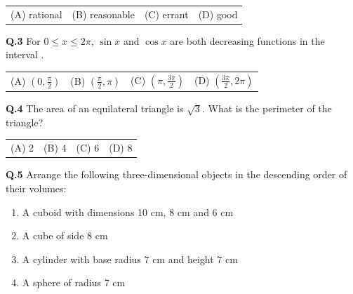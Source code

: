 \documentclass[journal,12pt,onecolumn]{IEEEtran}
\theoremstyle{remark}
\begin{document}
\begin{tabular}{llll}
\hspace{1cm} (A) rational & \hspace{0.5cm} (B) reasonable & \hspace{0.5cm} (C) errant &  \hspace{0.5cm} (D) good \\
\end{tabular}


\vspace{01cm}


\textbf{Q.3}  \hspace{0.2cm }\quad For \( 0 \leq x \leq 2\pi \), \( \sin x \) and \( \cos x \) are both decreasing functions in the interval \underline{\hspace{1cm}}.

\vspace{0.5cm}

\begin{tabular}{llll} 
\hspace{1.2cm}(A) \( \left( 0, \frac{\pi}{2} \right) \) & 
\hspace{0.5cm}(B) \( \left( \frac{\pi}{2}, \pi \right) \) & 
\hspace{0.5cm}(C) \( \left( \pi, \frac{3\pi}{2} \right) \) & 
\hspace{0.5cm}(D) \( \left( \frac{3\pi}{2}, 2\pi \right) \) \\
\end{tabular} 

\vspace{0.8cm}

\textbf{Q.4} \quad The area of an equilateral triangle is \( \sqrt{3} \). What is the perimeter of the triangle?

\vspace{0.5cm}

\begin{tabular}{llll}
\hspace{1.2cm}(A) 2 &\hspace{1.8cm}(B) 4 & \hspace{1.2cm}(C) 6 &\hspace{1.2cm} (D) 8 \\
\end{tabular}

\vspace{0.5cm}


\textbf{Q.5} \quad Arrange the following three-dimensional objects in the descending order of their volumes:


\begin{enumerate}[label=(\roman*), leftmargin=2.4 cm  ]
    \item A cuboid with dimensions 10 cm, 8 cm and 6 cm
    \item A cube of side 8 cm
    \item A cylinder with base radius 7 cm and height 7 cm
    \item A sphere of radius 7 cm
\end{enumerate}
\end{document}
